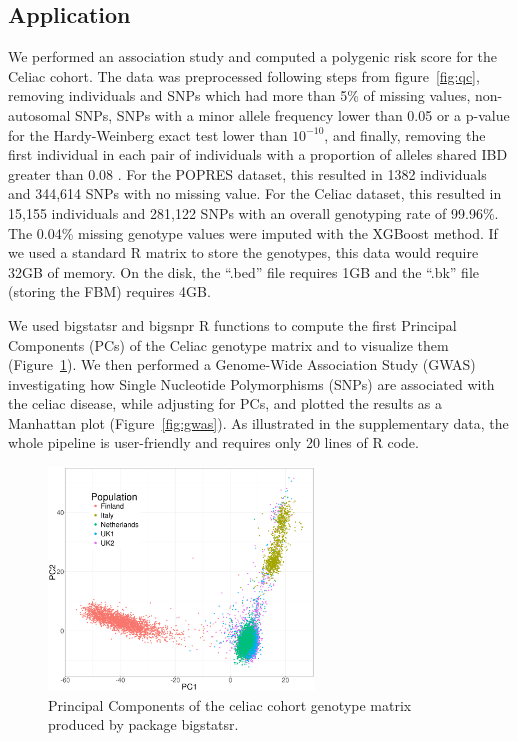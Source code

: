 \documentclass{bioinfo}
\begin{document}
\subsection{Application}
 
We performed an association study and computed a polygenic risk score for the Celiac cohort. 
The data was preprocessed following steps from figure~\ref{fig:qc}, removing individuals and SNPs which had more than 5\% of missing values, non-autosomal SNPs, SNPs with a minor allele frequency lower than 0.05 or a p-value for the Hardy-Weinberg exact test lower than $10^{-10}$, and finally, removing the first individual in each pair of individuals with a proportion of alleles shared IBD greater than 0.08 \cite[]{Purcell2007}. 
For the POPRES dataset, this resulted in 1382 individuals and 344,614 SNPs with no missing value.
For the Celiac dataset, this resulted in 15,155 individuals and 281,122 SNPs with an overall genotyping rate of 99.96\%. The 0.04\% missing genotype values were imputed with the XGBoost method. If we used a standard R matrix to store the genotypes, this data would require 32GB of memory. On the disk, the ``.bed'' file requires 1GB and the ``.bk'' file (storing the FBM) requires 4GB. 

We used bigstatsr and bigsnpr R functions to compute the first Principal Components (PCs) of the Celiac genotype matrix and to visualize them (Figure~\ref{fig:pca}). We then performed a Genome-Wide Association Study (GWAS) investigating how Single Nucleotide Polymorphisms (SNPs) are associated with the celiac disease, while adjusting for PCs, and plotted the results as a Manhattan plot (Figure~\ref{fig:gwas}). As illustrated in the supplementary data, the whole pipeline is user-friendly and requires only 20 lines of R code.

\begin{figure}[!tpb]
\centerline{\includegraphics[width=200pt]{celiac-pca}}
\caption{Principal Components of the celiac cohort genotype matrix produced by package bigstatsr.}\label{fig:pca}
\end{figure}
\end{document}
